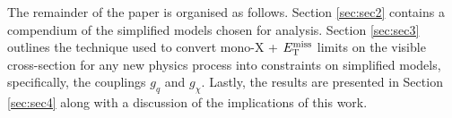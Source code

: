 The remainder of the paper is organised as follows. Section \ref{sec:sec2} contains a compendium of the simplified models chosen for analysis. Section \ref{sec:sec3} outlines the technique used to convert mono-X + $E_{\mathrm{T}}^{\mathrm{miss}}$ limits on the visible cross-section for any new physics process into constraints on simplified models, specifically, the couplings $g_q$ and $g_{\chi}$. Lastly, the results are presented in Section \ref{sec:sec4} along with a discussion of the implications of this work.
